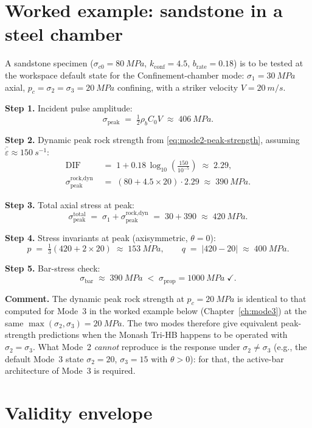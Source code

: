 \documentclass[11pt,a4paper,openany]{book}
\providecommand{\SI}[2]{\qty{#1}{#2}}
\theoremstyle{handbook}
\newcommand{\sig}{\sigma}
\newcommand{\eps}{\varepsilon}
\newcommand{\epsdot}{\dot\eps}
\newcommand{\Cz}{C_0}
\newcommand{\sigprop}{\sig_{\text{prop}}}
\newcommand{\sigpeak}{\sig_{\text{peak}}}
\begin{document}
\section{Worked example: sandstone in a steel chamber}

A sandstone specimen ($\sig_{c0}=\SI{80}{MPa}$, $k_{\text{conf}}=4.5$,
$b_{\text{rate}}=0.18$) is to be tested at the workspace default
state for the Confinement-chamber mode: $\sig_1=\SI{30}{MPa}$ axial,
$p_c=\sig_2=\sig_3=\SI{20}{MPa}$ confining, with a striker velocity
$V=\SI{20}{m/s}$.

\textbf{Step 1.} Incident pulse amplitude:
\[
  \sigpeak \;=\; \tfrac{1}{2}\rho_b\Cz V \;\approx\; \SI{406}{MPa}.
\]

\textbf{Step 2.} Dynamic peak rock strength from
\eqref{eq:mode2-peak-strength}, assuming
$\bar\epsdot\approx\SI{150}{s^{-1}}$:
\begin{align*}
  \text{DIF} &\;=\; 1 + 0.18\,\log_{10}\!\left(\frac{150}{10^{-5}}\right)
              \;\approx\; 2.29,\\
  \sig_{\text{peak}}^{\text{rock,dyn}}
    &\;=\; (80 + 4.5\times 20)\cdot 2.29 \;\approx\; \SI{390}{MPa}.
\end{align*}

\textbf{Step 3.} Total axial stress at peak:
\[
  \sigpeak^{\text{total}} \;=\; \sig_1 + \sig_{\text{peak}}^{\text{rock,dyn}}
                           \;=\; 30 + 390 \;\approx\; \SI{420}{MPa}.
\]

\textbf{Step 4.} Stress invariants at peak (axisymmetric, $\theta=0$):
\[
  p \;=\; \tfrac{1}{3}(420 + 2\times 20) \;\approx\; \SI{153}{MPa},
  \qquad
  q \;=\; |420-20| \;\approx\; \SI{400}{MPa}.
\]

\textbf{Step 5.} Bar-stress check:
\[
  \sig_{\text{bar}} \;\approx\; \SI{390}{MPa} \;<\; \sigprop=\SI{1000}{MPa}\;\checkmark.
\]

\textbf{Comment.} The dynamic peak rock strength at $p_c=\SI{20}{MPa}$
is identical to that computed for Mode~3 in the worked example below
(Chapter~\ref{ch:mode3}) at the same $\max(\sig_2,\sig_3)=\SI{20}{MPa}$.
The two modes therefore give equivalent peak-strength predictions when
the Monash Tri-HB happens to be operated with $\sig_2=\sig_3$. What
Mode~2 \emph{cannot} reproduce is the response under
$\sig_2\neq\sig_3$ (e.g., the default Mode~3 state $\sig_2=20$, $\sig_3=15$
with $\theta>0$): for that, the active-bar architecture of Mode~3 is
required.

\section{Validity envelope}
\end{document}
